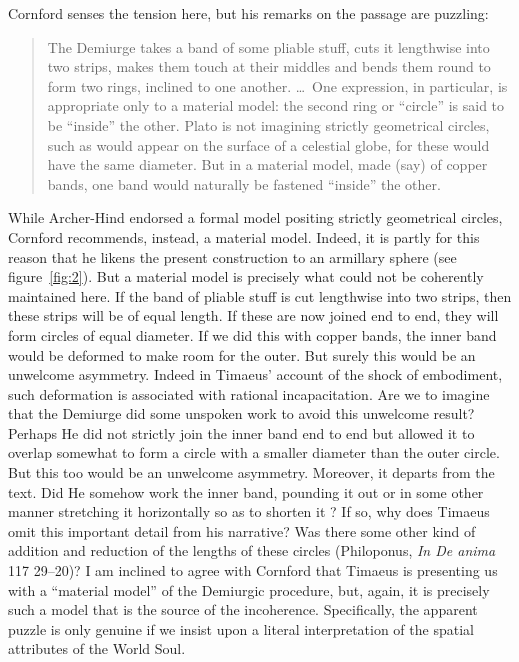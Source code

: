 Cornford senses the tension here, but his remarks on the passage are puzzling:
\begin{quote}
	The Demiurge takes a band of some pliable stuff, cuts it lengthwise into two strips, makes them touch at their middles and bends them round to form two rings, inclined to one another. \ldots\ One expression, in particular, is appropriate only to a material model: the second ring or ``circle'' is said to be ``inside'' the other. Plato is not imagining strictly geometrical circles, such as would appear on the surface of a celestial globe, for these would have the same diameter. But in a material model, made (say) of copper bands, one band would naturally be fastened ``inside'' the other. \citep[74]{Cornford:1935fk}
\end{quote}
While Archer-Hind endorsed a formal model positing strictly geometrical circles, Cornford recommends, instead, a material model. Indeed, it is partly for this reason that he likens the present construction to an armillary sphere (see figure~\ref{fig:2}). But a material model is precisely what could not be coherently maintained here. If the band of pliable stuff is cut lengthwise into two strips, then these strips will be of equal length. If these are now joined end to end, they will form circles of equal diameter. If we did this with copper bands, the inner band would be deformed to make room for the outer. But surely this would be an unwelcome asymmetry. Indeed in Timaeus' account of the shock of embodiment, such deformation is associated with rational incapacitation. Are we to imagine that the Demiurge did some unspoken work to avoid this unwelcome result? Perhaps He did not strictly join the inner band end to end but allowed it to overlap somewhat to form a circle with a smaller diameter than the outer circle. But this too would be an unwelcome asymmetry. Moreover, it departs from the text. Did He somehow work the inner band, pounding it out or in some other manner stretching it horizontally so as to shorten it \citep[119]{Dicks:1970aa}? If so, why does Timaeus omit this important detail from his narrative? Was there some other kind of addition and reduction of the lengths of these circles (Philoponus, \emph{In De anima} 117 29--20)? I am inclined to agree with Cornford that Timaeus is presenting us with a ``material model'' of the Demiurgic procedure, but, again, it is precisely such a model that is the source of the incoherence. Specifically, the apparent puzzle is only genuine if we insist upon a literal interpretation of the spatial attributes of the World Soul.

